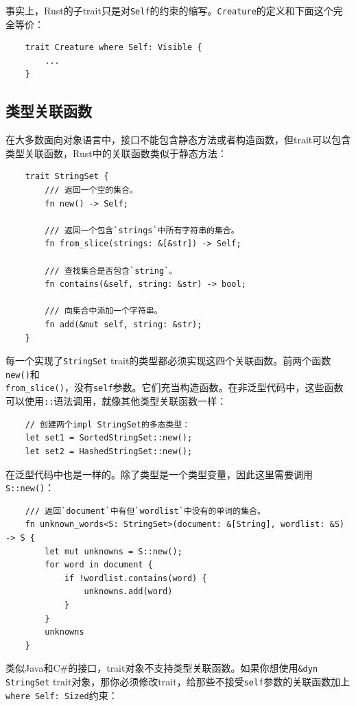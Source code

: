 事实上，Rust的子trait只是对\texttt{Self}的约束的缩写。\texttt{Creature}的定义和下面这个完全等价：
\begin{verbatim}
    trait Creature where Self: Visible {
        ...
    }
\end{verbatim}

\subsection{类型关联函数}
在大多数面向对象语言中，接口不能包含静态方法或者构造函数，但trait可以包含类型关联函数，Rust中的关联函数类似于静态方法：
\begin{verbatim}
    trait StringSet {
        /// 返回一个空的集合。
        fn new() -> Self;
        
        /// 返回一个包含`strings`中所有字符串的集合。
        fn from_slice(strings: &[&str]) -> Self;

        /// 查找集合是否包含`string`。
        fn contains(&self, string: &str) -> bool;

        /// 向集合中添加一个字符串。
        fn add(&mut self, string: &str);
    }
\end{verbatim}

每一个实现了\texttt{StringSet} trait的类型都必须实现这四个关联函数。前两个函数\texttt{new()}和\\
\texttt{from\_slice()}，没有\texttt{self}参数。它们充当构造函数。在非泛型代码中，这些函数可以使用\texttt{::}语法调用，就像其他类型关联函数一样：
\begin{verbatim}
    // 创建两个impl StringSet的多态类型：
    let set1 = SortedStringSet::new();
    let set2 = HashedStringSet::new();
\end{verbatim}

在泛型代码中也是一样的。除了类型是一个类型变量，因此这里需要调用\texttt{S::new()}：
\begin{verbatim}
    /// 返回`document`中有但`wordlist`中没有的单词的集合。
    fn unknown_words<S: StringSet>(document: &[String], wordlist: &S) -> S {
        let mut unknowns = S::new();
        for word in document {
            if !wordlist.contains(word) {
                unknowns.add(word)
            }
        }
        unknowns
    }
\end{verbatim}

类似Java和C\#的接口，trait对象不支持类型关联函数。如果你想使用\texttt{\&dyn StringSet} trait对象，那你必须修改trait，给那些不接受\texttt{self}参数的关联函数加上\texttt{where Self: Sized}约束：

